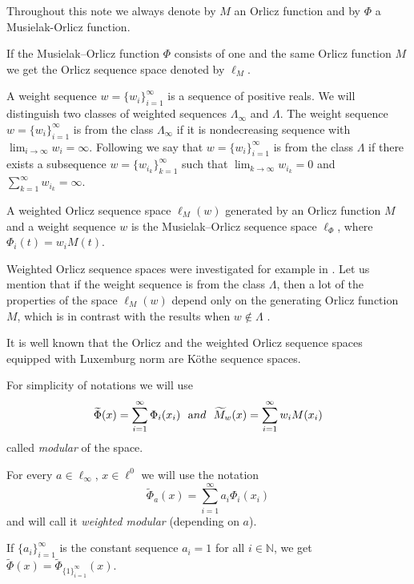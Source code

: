 \documentclass[12pt]{article}
\theoremstyle{thmstyleone}%
\theoremstyle{thmstyletwo}%
\theoremstyle{thmstylethree}%
\begin{document}
 

Throughout this note we always denote by $M$ an Orlicz function
and by $\Phi$ a Musielak-Orlicz function.

If the Musielak--Orlicz function $\Phi$ consists of one and the same Orlicz
function $M$ we get the Orlicz sequence space denoted by $\ell_M$.

A weight sequence $w=\{w_i\}_{i=1}^\infty$ is a sequence of
positive reals. We will distinguish two classes of weighted
sequences $\Lambda_\infty$ and $\Lambda$. The weight sequence
$w=\{w_i\}_{i=1}^\infty$ is from the class $\Lambda_\infty$ if it
is nondecreasing sequence with $\displaystyle\lim_{i\to\infty}w_i=\infty$.
Following \cite{Hernandez,Fuentes-Hernandez} we say that $w=\{w_i\}_{i=1}^\infty$ is from
the class $\Lambda$ if there exists a subsequence
$w=\{w_{i_k}\}_{k=1}^\infty$ such that
$\displaystyle\lim_{k\to\infty}w_{i_k}=0$ and $\displaystyle\sum_{k=1}^\infty
w_{i_k}=\infty$.

A weighted Orlicz sequence space $\ell_M(w)$ generated by an
Orlicz function $M$ and a weight sequence $w$ is the Musielak--Orlicz sequence
space $\ell_\Phi$, where $\Phi_i(t)=w_iM(t)$.

Weighted Orlicz sequence spaces were investigated for example in
\cite{Fuentes-Hernandez,Pierats-Ruiz,Kaminska98,Kaminska-Mastylo}. Let us
mention that if the weight sequence is from the class $\Lambda$,
then a lot of the properties of the space $\ell_M(w)$ depend only
on the generating Orlicz function $M$, which is in contrast with
the results when $w\not\in\Lambda$ \cite{Hernandez,Ruiz,Maleev-Zlatanov}.

It is well known that the Orlicz and the weighted Orlicz sequence
spaces equipped with Luxemburg norm are K\"othe
sequence spaces. 

For simplicity of notations we will use 
$$
\widetilde \Phi
(x)=\displaystyle\sum_{i=1}^\infty \Phi_i(x_i)
\ \ {\mbox and} \ \  \widetilde
M_w(x)=\displaystyle\sum_{i=1}^\infty w_iM(x_i)
$$
called {\it modular} of the space.
 
For every $a\in\ell_\infty$, $x\in \ell^{0}$ we will use the notation
$$
\widetilde{\Phi}_a(x)=\sum_{i=1}^{\infty}a_i\Phi_i(x_i)
$$
and will call it {\it weighted modular} (depending on $a$).

If $\{a_i\}_{i=1}^\infty$ is the constant sequence $a_i=1$ for all $i\in\mathbb{N}$, we get 
$\widetilde{\Phi}(x)=\widetilde{\Phi}_{\{1\}_{i=1}^\infty}(x)$.
\end{document}
